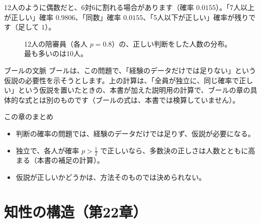\documentclass[a4paper,11pt,openany]{ltjsbook}
\begin{document}
12人のように偶数だと、6対6に割れる場合があります（確率 $0.0155$）。「7人以上が正しい」確率 $0.9806$、「同数」確率 $0.0155$、「5人以下が正しい」確率が残りです（足して $1$）。

\begin{figure}[htbp]
\centering
{}
\caption{12人の陪審員（各人 $p=0.8$）の、正しい判断をした人数の分布。最も多いのは10人。}
\end{figure}

\begin{notebox}{ブールの文脈}
ブールは、この問題で、「経験のデータだけでは足りない」という仮説の必要性を示そうとします。上の計算は、「全員が独立に、同じ確率で正しい」という仮説を置いたときの、本書が加えた説明用の計算で、ブールの章の具体的な式とは別のものです（ブールの式は、本書では検算していません）。
\end{notebox}

\begin{pointbox}{この章のまとめ}
\begin{itemize}[leftmargin=*]
\item 判断の確率の問題では、経験のデータだけでは足りず、仮説が必要になる。
\item 独立で、各人が確率 $p>\tfrac12$ で正しいなら、多数決の正しさは人数とともに高まる（本書の補足の計算）。
\item 仮説が正しいかどうかは、方法そのものでは決められない。
\end{itemize}
\end{pointbox}

\chapter{知性の構造（第22章）}
\end{document}
